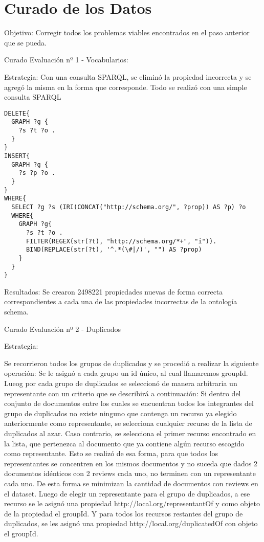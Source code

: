 \chapter{Curado de los Datos}
\label{chapter:curado}

Objetivo:
Corregir todos los problemas viables encontrados en el paso anterior que se pueda.

Curado Evaluación nº 1 - Vocabularios:

Estrategia:
Con una consulta SPARQL, se eliminó la propiedad incorrecta y se agregó la misma en la forma que corresponde.
Todo se realizó con una simple consulta SPARQL
\begin{lstlisting}[frame=single]  
DELETE{
  GRAPH ?g {
    ?s ?t ?o .
  }
}
INSERT{
  GRAPH ?g {
    ?s ?p ?o .
  }
}
WHERE{
  SELECT ?g ?s (IRI(CONCAT("http://schema.org/", ?prop)) AS ?p) ?o
  WHERE{
    GRAPH ?g{
      ?s ?t ?o .
      FILTER(REGEX(str(?t), "http://schema.org/*+", "i")).
      BIND(REPLACE(str(?t), '^.*(\#|/)', "") AS ?prop)
    }
  }
}
\end{lstlisting}


Resultados:
Se crearon 2498221 propiedades nuevas de forma correcta correspondientes a cada una de las propiedades incorrectas de la ontología 
schema.

Curado Evaluación nº 2 - Duplicados

Estrategia: 

Se recorrieron todos los grupos de duplicados y se procedió a realizar la siguiente operación:
Se le asignó a cada grupo un id único, al cual llamaremos groupId.
Lueog por cada grupo de duplicados se seleccionó de manera arbitraria un representante con un criterio que se describirá a continuación:
Si dentro del conjunto de documentos entre los cuales se encuentran todos los integrantes del grupo de duplicados no existe ninguno 
que contenga un recurso ya elegido anteriormente como representante, se selecciona cualquier recurso de la lista de duplicados al azar.
Caso contrario, se selecciona el primer recurso encontrado en la lista, que pertenezca al documento que ya contiene algún recurso escogido 
como representante.
Esto se realizó de esa forma, para que todos los representantes se concentren en los mismos documentos y no suceda que dados 2 
documentos idénticos con 2 reviews cada uno, no terminen con un representante cada uno. De esta forma se minimizan la cantidad de 
documentos con reviews en el dataset.
Luego de elegir un representante para el grupo de duplicados, a ese recurso se le asignó una propiedad http://local.org/representantOf y 
como objeto de la propiedad el groupId.
Y para todos los recursos restantes del grupo de duplicados, se les asignó una propiedad http://local.org/duplicatedOf con objeto 
el groupId.

